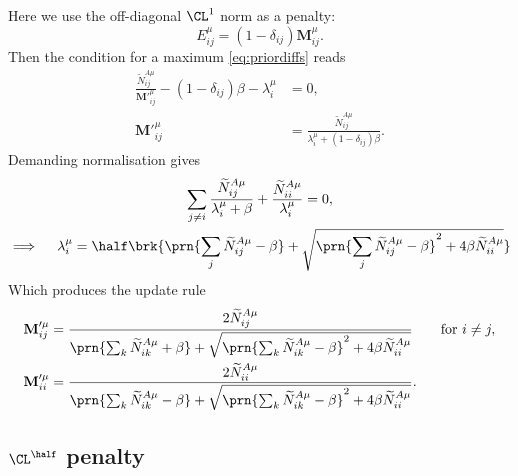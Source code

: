 \documentclass[12pt]{article}
\newcommand{\M}{\mathbf{M}}
\begin{document}
Here we use the off-diagonal $\CL^1$ norm as a penalty:
%
\begin{equation}\label{eq:L1penalty}
  E^\mu_{ij} = (1-\delta_{ij}) \M^\mu_{ij}.
\end{equation}
%
Then the condition for a maximum \eqref{eq:priordiffs} reads
%
\begin{equation}\label{eq:L1priormax}
\begin{aligned}
  \frac{ \widetilde{N}^{A\mu}_{ij} }{ \M'^\mu_{ij} }  - (1-\delta_{ij})\beta - \lambda^\mu_{i} &= 0, \\
   \M'^\mu_{ij} &= \frac{\widetilde{N}^{A\mu}_{ij}}{\lambda^\mu_{i}+(1-\delta_{ij})\beta}.
\end{aligned}
\end{equation}
%
Demanding normalisation gives
%
\begin{multline}\label{eq:L1norm}
  \sum_{j \neq i}\frac{\widetilde{N}^{A\mu}_{ij}}{\lambda^\mu_{i}+\beta} +\frac{\widetilde{N}^{A\mu}_{ii}}{\lambda^\mu_{i}} =0, \\
  \implies \quad
  \lambda^\mu_{i} = \half \brk{ \prn{\sum_j \widetilde{N}^{A\mu}_{ij} -\beta} + 
     \sqrt{\prn{\sum_j \widetilde{N}^{A\mu}_{ij} -\beta}^2 +4\beta\widetilde{N}^{A\mu}_{ii}}}
\end{multline}
%
Which produces the update rule
%
\begin{equation}\label{eq:L1update}
\begin{aligned}
  \M'^\mu_{ij} &= \frac{ 2\widetilde{N}^{A\mu}_{ij} }{ \prn{\sum_k \widetilde{N}^{A\mu}_{ik} +\beta} +
     \sqrt{\prn{\sum_k \widetilde{N}^{A\mu}_{ik} -\beta}^2 +4\beta\widetilde{N}^{A\mu}_{ii}} } 
     \qquad \text{for } i\neq j, \\
  \M'^\mu_{ii} &= \frac{ 2\widetilde{N}^{A\mu}_{ii} }{ \prn{\sum_k \widetilde{N}^{A\mu}_{ik} -\beta} +
     \sqrt{\prn{\sum_k \widetilde{N}^{A\mu}_{ik} -\beta}^2 +4\beta\widetilde{N}^{A\mu}_{ii}} }.
\end{aligned}
\end{equation}
%


\subsection{\texorpdfstring{$\CL^\half$}{L\textasciicircum1/2} penalty \label{sec:Lhalf}}
\end{document}
